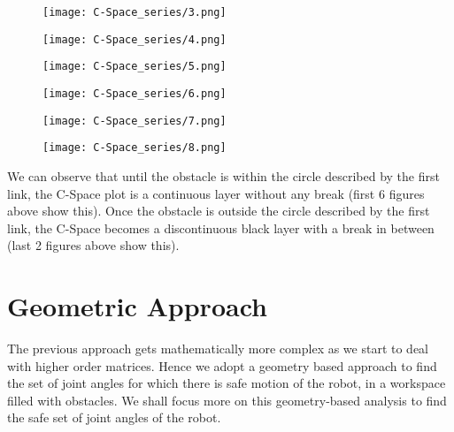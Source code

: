 \documentclass[12pt]{article}
\begin{document}
\begin{figure}[h]
    \centering

    \begin{minipage}{0.48\textwidth}
        \centering
        \texttt{[image: C-Space\_series/3.png]}
    \end{minipage}
    \hfill
    \begin{minipage}{0.48\textwidth}
        \centering
        \texttt{[image: C-Space\_series/4.png]}
    \end{minipage}

    \vspace{0.5cm}

    \begin{minipage}{0.48\textwidth}
        \centering
        \texttt{[image: C-Space\_series/5.png]}
    \end{minipage}
    \hfill
    \begin{minipage}{0.48\textwidth}
        \centering
        \texttt{[image: C-Space\_series/6.png]}
    \end{minipage}

    \vspace{0.5cm}

    \begin{minipage}{0.48\textwidth}
        \centering
        \texttt{[image: C-Space\_series/7.png]}
    \end{minipage}
    \hfill
    \begin{minipage}{0.48\textwidth}
        \centering
        \texttt{[image: C-Space\_series/8.png]}
    \end{minipage}
\end{figure}\clearpage
We can observe that until the obstacle is within the circle described by the first link, the C-Space plot is a continuous layer without any break (first 6 figures above show this). Once the obstacle is outside the circle described by the first link, the C-Space becomes a discontinuous black layer with a break in between (last 2 figures above show this).
\section{Geometric Approach}
The previous approach gets mathematically more complex as we start to deal with higher order matrices. Hence we adopt a geometry based approach to find the set of joint angles for which there is safe motion of the robot, in a workspace filled with obstacles. We shall focus more on this geometry-based analysis to find the safe set of joint angles of the robot.
\end{document}
